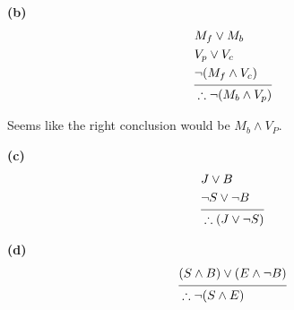 \sol \textbf{(b)} 
    \begin{align*}
       &M_f \lor M_b\\
       &V_p \lor V_c\\ 
       &\neg (M_f \land V_c)\\
        \noalign{\vspace{-8pt}}
        \cline{1-2}
        \noalign{\vspace{-4pt}}
       &\therefore \neg (M_b \land V_p)
    \end{align*}

Seems like the right conclusion would be $M_b \land V_P$.

\newpage
  
\sol \textbf{(c)}
    \begin{align*}
        &J \lor B\\
        &\neg S \lor \neg B\\ 
        \noalign{\vspace{-8pt}}
        \cline{1-2}
        \noalign{\vspace{-4pt}}
        &\therefore (J \lor \neg S)
    \end{align*}
  
\sol \textbf{(d)}
    \begin{align*}
        &(S \land B) \lor (E \land \neg B)\\
        \noalign{\vspace{-8pt}}
        \cline{1-2}
        \noalign{\vspace{-4pt}}
        &\therefore \neg (S \land E)
    \end{align*}
  






